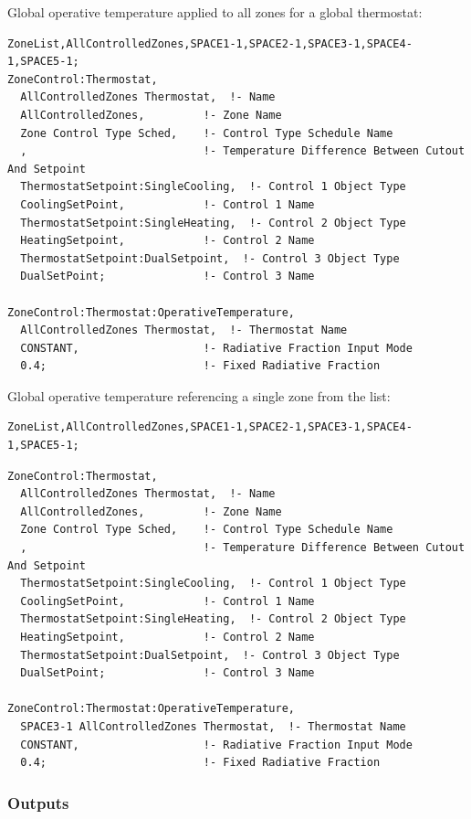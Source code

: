 Global operative temperature applied to all zones for a global thermostat:

\begin{lstlisting}
ZoneList,AllControlledZones,SPACE1-1,SPACE2-1,SPACE3-1,SPACE4-1,SPACE5-1;
ZoneControl:Thermostat,
  AllControlledZones Thermostat,  !- Name
  AllControlledZones,         !- Zone Name
  Zone Control Type Sched,    !- Control Type Schedule Name
  ,                           !- Temperature Difference Between Cutout And Setpoint
  ThermostatSetpoint:SingleCooling,  !- Control 1 Object Type
  CoolingSetPoint,            !- Control 1 Name
  ThermostatSetpoint:SingleHeating,  !- Control 2 Object Type
  HeatingSetpoint,            !- Control 2 Name
  ThermostatSetpoint:DualSetpoint,  !- Control 3 Object Type
  DualSetPoint;               !- Control 3 Name

ZoneControl:Thermostat:OperativeTemperature,
  AllControlledZones Thermostat,  !- Thermostat Name
  CONSTANT,                   !- Radiative Fraction Input Mode
  0.4;                        !- Fixed Radiative Fraction
\end{lstlisting}

Global operative temperature referencing a single zone from the list:

\begin{lstlisting}
ZoneList,AllControlledZones,SPACE1-1,SPACE2-1,SPACE3-1,SPACE4-1,SPACE5-1;
\end{lstlisting}

\begin{lstlisting}
ZoneControl:Thermostat,
  AllControlledZones Thermostat,  !- Name
  AllControlledZones,         !- Zone Name
  Zone Control Type Sched,    !- Control Type Schedule Name
  ,                           !- Temperature Difference Between Cutout And Setpoint
  ThermostatSetpoint:SingleCooling,  !- Control 1 Object Type
  CoolingSetPoint,            !- Control 1 Name
  ThermostatSetpoint:SingleHeating,  !- Control 2 Object Type
  HeatingSetpoint,            !- Control 2 Name
  ThermostatSetpoint:DualSetpoint,  !- Control 3 Object Type
  DualSetPoint;               !- Control 3 Name

ZoneControl:Thermostat:OperativeTemperature,
  SPACE3-1 AllControlledZones Thermostat,  !- Thermostat Name
  CONSTANT,                   !- Radiative Fraction Input Mode
  0.4;                        !- Fixed Radiative Fraction
\end{lstlisting}

\subsubsection{Outputs}\label{outputs-1-032}

